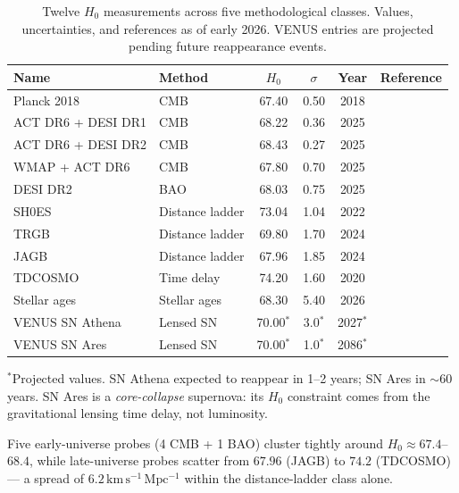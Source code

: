 \documentclass[
  aps,
  prd,
  twocolumn,
  superscriptaddress,
  nofootinbib,
  floatfix
]{revtex4-2}
\begin{document}
\begin{table}[t]
\caption{\label{tab:measurements}Twelve $H_0$ measurements
across five methodological classes. Values, uncertainties, and
references as of early 2026. VENUS entries are projected pending
future reappearance events.}
\begin{ruledtabular}
\begin{tabular}{llcccl}
Name & Method & $H_0$ & $\sigma$ & Year & Reference \\
\hline
Planck 2018         & CMB             & 67.40 & 0.50 & 2018 & \cite{planck2018vi} \\
ACT DR6 + DESI DR1  & CMB             & 68.22 & 0.36 & 2025 & \cite{louis2025act_dr6} \\
ACT DR6 + DESI DR2  & CMB             & 68.43 & 0.27 & 2025 & \cite{louis2025act_dr6} \\
WMAP + ACT DR6       & CMB             & 67.80 & 0.70 & 2025 & \cite{louis2025act_dr6} \\
DESI DR2             & BAO             & 68.03 & 0.75 & 2025 & \cite{desi2025dr2} \\
SH0ES                & Distance ladder & 73.04 & 1.04 & 2022 & \cite{riess2022shoes} \\
TRGB                 & Distance ladder & 69.80 & 1.70 & 2024 & \cite{freedman2024trgb} \\
JAGB                 & Distance ladder & 67.96 & 1.85 & 2024 & \cite{freedman2024trgb} \\
TDCOSMO              & Time delay      & 74.20 & 1.60 & 2020 & \cite{birrer2020tdcosmo} \\
Stellar ages         & Stellar ages    & 68.30 & 5.40 & 2026 & \cite{tomasetti2026stellar} \\
VENUS SN Athena      & Lensed SN       & 70.00$^*$ & 3.0$^*$ & 2027$^*$ & \cite{venus2026} \\
VENUS SN Ares        & Lensed SN       & 70.00$^*$ & 1.0$^*$ & 2086$^*$ & \cite{venus2026} \\
\end{tabular}
\end{ruledtabular}
\vspace{1mm}
{\footnotesize $^*$Projected values. SN Athena expected to reappear
in 1--2 years; SN Ares in $\sim$60 years. SN Ares is a
\emph{core-collapse} supernova: its $H_0$ constraint comes from the
gravitational lensing time delay, not luminosity.}
\end{table}

Five early-universe probes (4 CMB + 1 BAO) cluster tightly around
$H_0 \approx 67.4$--$68.4$, while late-universe probes scatter
from $67.96$ (JAGB) to $74.2$ (TDCOSMO) --- a spread of
$6.2\,\mathrm{km\,s^{-1}\,Mpc^{-1}}$ within the distance-ladder
class alone.
\end{document}
